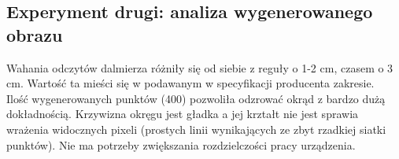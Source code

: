 \subsection {Experyment drugi: analiza wygenerowanego obrazu}

Wahania odczytów dalmierza różniły się od siebie z reguły o 1-2 cm, czasem o 3 cm. Wartość ta mieści się w podawanym w specyfikacji producenta zakresie.\\

Ilość wygenerowanych punktów (400) pozwoliła odzrować okrąd z bardzo dużą dokładnością. Krzywizna okręgu jest gładka a jej krztałt nie jest sprawia wrażenia widocznych pixeli (prostych linii wynikających ze zbyt rzadkiej siatki punktów). Nie ma potrzeby zwiększania rozdzielczości pracy urządzenia.\\

